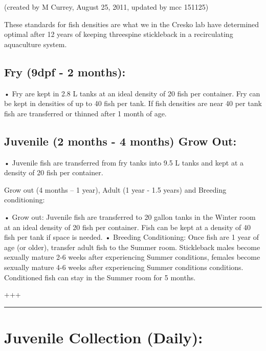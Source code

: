\documentclass[
]{book}
\begin{document}
(created by M Currey, August 25, 2011, updated by mcc 151125)

These standards for fish densities are what we in the Cresko lab have determined optimal after 12 years of keeping threespine stickleback in a recirculating aquaculture system.

\hypertarget{fry-9dpf---2-months}{%
\subsection{Fry (9dpf - 2 months):}\label{fry-9dpf---2-months}}

• Fry are kept in 2.8 L tanks at an ideal density of 20 fish per container. Fry can be kept in densities of up to 40 fish per tank. If fish densities are near 40 per tank fish are transferred or thinned after 1 month of age.

\hypertarget{juvenile-2-months---4-months-grow-out}{%
\subsection{Juvenile (2 months - 4 months) Grow Out:}\label{juvenile-2-months---4-months-grow-out}}

• Juvenile fish are transferred from fry tanks into 9.5 L tanks and kept at a density of 20 fish per container.

Grow out (4 months -- 1 year), Adult (1 year - 1.5 years) and Breeding conditioning:

• Grow out: Juvenile fish are transferred to 20 gallon tanks in the Winter room at an ideal density of 20 fish per container. Fish can be kept at a density of 40 fish per tank if space is needed.
• Breeding Conditioning: Once fish are 1 year of age (or older), transfer adult fish to the Summer room. Stickleback males become sexually mature 2-6 weeks after experiencing Summer conditions, females become sexually mature 4-6 weeks after experiencing Summer conditions conditions. Conditioned fish can stay in the Summer room for 5 months.

+++

\begin{center}\rule{0.5\linewidth}{0.5pt}\end{center}

\hypertarget{juvenile-collection-daily}{%
\section{Juvenile Collection (Daily):}\label{juvenile-collection-daily}}
\end{document}
